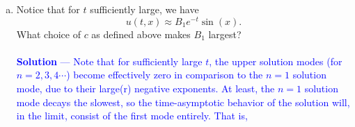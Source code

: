 \documentclass[12pt]{article}
\begin{document}
\begin{enumerate}[(a)]
{\begin{align*}
& u(0,x) = h(x) \;\;\; \text{(for $0 \leq x \leq \pi$)} \\
\implies& \sum_{n=1}^{\infty} C_n \sin \left( nx \right) = h(x) \\
\end{align*}
This is exactly the Fourier $\sin$ expansion of $h(x)$ on $[0, \pi]$. Hence \\ \\
\begin{align*}
C_n &= \frac{2}{\pi} \int_0^{\pi} h(x) \sin (nx) dx \\
\end{align*}
Note that
\begin{align*}
& \frac{\pi}{10} < c < \frac{9\pi}{10} \implies c - \frac{\pi}{10} > 0 \;\; \text{and} \;\; c + \frac{\pi}{10} < \pi
\end{align*}
So the piecewise interval is contained fully in $[0,\pi]$: $$\left[ c - \frac{\pi}{10}, c + \frac{\pi}{10}\right] \in [0,\pi]$$ Hence
\begin{align*}
C_n &= \frac{2}{\pi} \int_{c - \frac{\pi}{10}}^{c + \frac{\pi}{10}} (5) \sin (nx) dx \\
&= \frac{10}{\pi} \int_{c - \frac{\pi}{10}}^{c + \frac{\pi}{10}} \sin (nx) dx \\
&= -\frac{10}{n\pi} \left[ \cos (nx) \right]_{c - \frac{\pi}{10}}^{c + \frac{\pi}{10}} \\
&= -\frac{10}{n\pi} \left[ \cos \left( n \left( c + \frac{\pi}{10} \right) \right) - \cos \left( n \left( c - \frac{\pi}{10} \right) \right) \right]\\
\end{align*}
We apply the identity$$\cos(\alpha) - \cos(\beta) = -2\sin \left( \frac{\alpha + \beta}{2} \right)\sin \left( \frac{\alpha - \beta}{2} \right)$$ to get
$$C_n = \frac{20}{n\pi} \sin \left(nc \right) \sin \left( \frac{n\pi}{10} \right)$$
Hence the solution is
$$\boxed{u(t,x) = \frac{20}{\pi} \sum_{n=1}^{\infty} \frac{ \sin \left(nc \right) }{n} \sin \left( \frac{n\pi}{10} \right) e^{-n^2 t} \sin \left( nx \right)}$$
}
\item Notice that for $t$ sufficiently large, we have
$$u(t,x) \approx  B_1 e^{-t} \sin(x).$$
What choice of $c$ as defined above makes $B_1$ largest? \\ \\
\textcolor{blue}{\textbf{Solution} — Note that for sufficiently large $t$, the upper solution modes (for $n=2,3,4 \cdots$) become effectively zero in comparison to the $n=1$ solution mode, due to their large(r) negative exponents. At least, the $n=1$ solution mode decays the slowest, so the time-asymptotic behavior of the solution will, in the limit, consist of the first mode entirely. That is, 
}
\end{enumerate}
\end{document}
